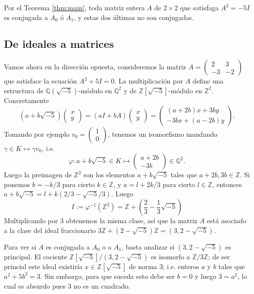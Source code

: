 \documentclass[11pt,a4paper]{amsart}
\newcommand{\Q}{\mathbb{Q}}
\newcommand{\Z}{\mathbb{Z}}
\numberwithin{equation}{section}
\theoremstyle{plain}
\begin{document}
Por el Teorema \ref{thm:main}, toda matriz entera $A$
de $2 \times 2$ que satisfaga $A^2 = -5 I$ es conjugada a $A_0$ ó $A_1$,
y estas dos últimas no son conjugadas.

\subsection{De ideales a matrices}

Vamos ahora en la dirección opuesta, consideremos la matriz
$A = \begin{pmatrix}2 & 3 \\ -3 & -2 \end{pmatrix}$ que
satisface la ecuación $A^2 + 5 I = 0$. La multiplicación
por $A$ define una estructura de $\Q(\sqrt{-5})$-módulo
en $\Q^2$ y de $\Z[\sqrt{-5}]$-módulo en $\Z^2$. Concretamente
\[
(a+b\sqrt{-5})\begin{pmatrix}x\\ y\end{pmatrix}
= (aI+bA)\begin{pmatrix}x\\ y\end{pmatrix}
= \begin{pmatrix}(a+2b)x+3by\\-3bx + (a-2b)y\end{pmatrix}.
\]
Tomando por ejemplo $v_0 =\begin{pmatrix} 1 \\ 0\end{pmatrix}$,
tenemos un isomorfismo mandando $\gamma \in K \mapsto \gamma v_0$, i.e.
\[
\varphi \colon
a+b\sqrt{-5} \in K \longmapsto \begin{pmatrix}a+2b\\-3b\end{pmatrix} \in \Q^2.
\]
Luego la preimagen de $\Z^2$ son los elementos $a+b\sqrt{-5}$
tales que $a+2b, 3b \in \Z$. Si ponemos $b = -k/3$ para cierto $k \in \Z$,
y $a = l+2k/3$ para cierto $l \in \Z$, entonces $a+b\sqrt{-5}
= l + k(2/3-\sqrt{-5}/3)$. Luego
\[
I := \varphi^{-1}(\Z^2) =
\Z + \left(\frac{2}{3}-\frac{1}{3}\sqrt{-5}\right)
\]
Multiplicando por $3$ obtenemos la misma clase, así que la matriz $A$
está asociado a la clase del ideal fraccionario $3\Z+(2-\sqrt{-5})\Z
= (3,2-\sqrt{-5})$.

Para ver si $A$ es conjugada a $A_0$ o a $A_1$,
basta analizar si $(3,2-\sqrt{-5})$ es principal. El cociente
$\Z[\sqrt{-5}]/(3,2-\sqrt{-5})$ es isomorfo a $\Z/3\Z$; de ser
princial este ideal existiría $x \in \Z[\sqrt{-5}]$ de norma $3$;
i.e. enteros $a$ y $b$ tales que $a^2+5b^2 = 3$. Sin embargo,
para que suceda esto debe ser $b = 0$ y luego $3 = a^2$, lo cual
es absurdo pues $3$ no es un cuadrado.
\end{document}
